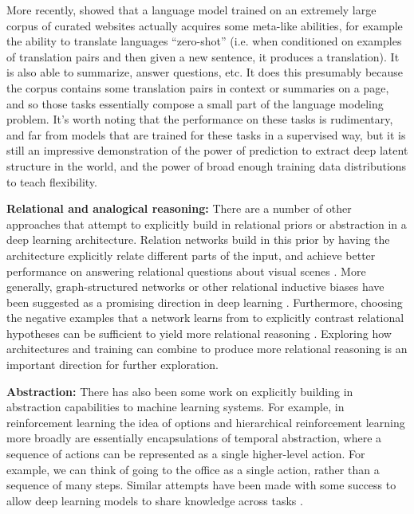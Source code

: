 \documentclass[11pt]{article}
\begin{document}
More recently, \citet{Radford2019} showed that a language model trained on an extremely large corpus of curated websites actually acquires some meta-like abilities, for example the ability to translate languages ``zero-shot'' (i.e. when conditioned on examples of translation pairs and then given a new sentence, it produces a translation). It is also able to summarize, answer questions, etc. It does this presumably because the corpus contains some translation pairs in context or summaries on a page, and so those tasks essentially compose a small part of the language modeling problem. It's worth noting that the performance on these tasks is rudimentary, and far from models that are trained for these tasks in a supervised way, but it is still an impressive demonstration of the power of prediction to extract deep latent structure in the world, and the power of broad enough training data distributions to teach flexibility. \par  
\textbf{Relational and analogical reasoning:} There are a number of other approaches that attempt to explicitly build in relational priors or abstraction in a deep learning architecture. Relation networks build in this prior by having the architecture explicitly relate different parts of the input, and achieve better performance on answering relational questions about visual scenes \citep{Santoro2017}. More generally, graph-structured networks or other relational inductive biases have been suggested as a promising direction in deep learning \citep{Battaglia2018}. Furthermore, choosing the negative examples that a network learns from to explicitly contrast relational hypotheses can be sufficient to yield more relational reasoning \citep{Hill2019}. Exploring how architectures and training can combine to produce more relational reasoning is an important direction for further exploration. \par
\textbf{Abstraction:} There has also been some work on explicitly building in abstraction capabilities to machine learning systems. For example, in reinforcement learning the idea of options \citep{Sutton1999} and hierarchical reinforcement learning more broadly \citep[e.g.]{Botvinick2009} are essentially encapsulations of temporal abstraction, where a sequence of actions can be represented as a single higher-level action. For example, we can think of going to the office as a single action, rather than a sequence of many steps. Similar attempts have been made with some success to allow deep learning models to share knowledge across tasks \citep[e.g.]{Tessler2016}. \par 
\end{document}
